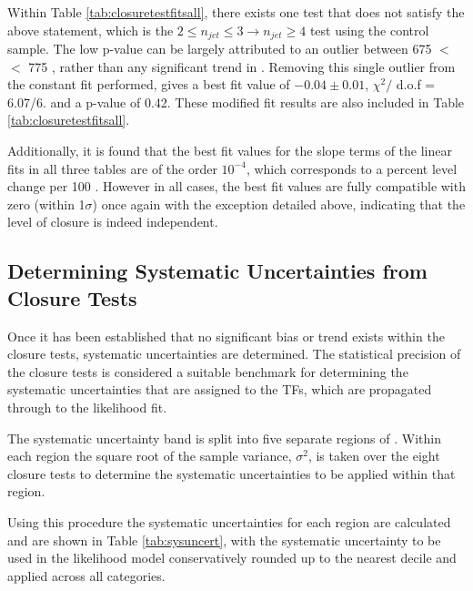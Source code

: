 Within Table \ref{tab:closuretestfitsall}, there exists one test that does not satisfy the above statement, which is the $2 \leq n_{jet} \leq 3 \rightarrow n_{jet} \geq 4$ test using the \mupjets control sample. The low p-value can be largely attributed to an outlier between 675 $<$ \theht $<$ 775 \GeV, rather than any significant trend in \theht. Removing this single outlier from the constant fit performed, gives a best fit value of $-0.04 \pm 0.01$, $\chi^{2} /$ d.o.f = 6.07/6. and a p-value of 0.42. These modified fit results are also included in Table \ref{tab:closuretestfitsall}.

Additionally, it is found that the best fit values for the slope terms of the linear fits in all three tables are of the order $10^{-4}$, which corresponds to a percent level change per 100 \GeV. However in all cases, the best fit values are fully compatible with zero (within 1$\sigma$) once again with the exception detailed above, indicating that the level of closure is indeed \theht independent.

\subsection{Determining Systematic Uncertainties from Closure Tests}
\label{subsec:determinesystematics}

Once it has been established that no significant bias or trend exists within the closure tests, systematic uncertainties are determined. The statistical precision of the closure tests is considered a suitable benchmark for determining the systematic uncertainties that are assigned to the \ac{TF}s, which are propagated through to the likelihood fit.

The systematic uncertainty band is split into five separate regions of \theht. Within each region the square root of the sample variance, $\sigma^{2}$, is taken over the eight closure tests to determine the systematic uncertainties to be applied within that region.

Using this procedure the systematic uncertainties for each region are calculated and are shown in Table \ref{tab:sysuncert}, with the systematic uncertainty to be used in the likelihood model conservatively rounded up to the nearest decile and applied across all \nbreco categories.

